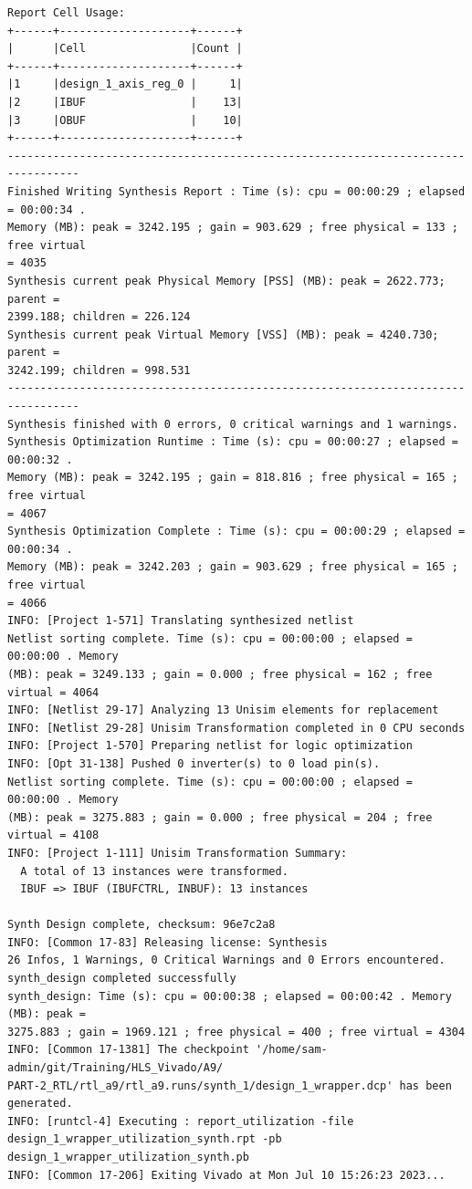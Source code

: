 \documentclass{article}
\begin{document}
\begin{lstlisting}
Report Cell Usage: 
+------+--------------------+------+
|      |Cell                |Count |
+------+--------------------+------+
|1     |design_1_axis_reg_0 |     1|
|2     |IBUF                |    13|
|3     |OBUF                |    10|
+------+--------------------+------+
---------------------------------------------------------------------------------
Finished Writing Synthesis Report : Time (s): cpu = 00:00:29 ; elapsed = 00:00:34 . 
Memory (MB): peak = 3242.195 ; gain = 903.629 ; free physical = 133 ; free virtual 
= 4035
Synthesis current peak Physical Memory [PSS] (MB): peak = 2622.773; parent = 
2399.188; children = 226.124
Synthesis current peak Virtual Memory [VSS] (MB): peak = 4240.730; parent = 
3242.199; children = 998.531
---------------------------------------------------------------------------------
Synthesis finished with 0 errors, 0 critical warnings and 1 warnings.
Synthesis Optimization Runtime : Time (s): cpu = 00:00:27 ; elapsed = 00:00:32 . 
Memory (MB): peak = 3242.195 ; gain = 818.816 ; free physical = 165 ; free virtual 
= 4067
Synthesis Optimization Complete : Time (s): cpu = 00:00:29 ; elapsed = 00:00:34 . 
Memory (MB): peak = 3242.203 ; gain = 903.629 ; free physical = 165 ; free virtual 
= 4066
INFO: [Project 1-571] Translating synthesized netlist
Netlist sorting complete. Time (s): cpu = 00:00:00 ; elapsed = 00:00:00 . Memory 
(MB): peak = 3249.133 ; gain = 0.000 ; free physical = 162 ; free virtual = 4064
INFO: [Netlist 29-17] Analyzing 13 Unisim elements for replacement
INFO: [Netlist 29-28] Unisim Transformation completed in 0 CPU seconds
INFO: [Project 1-570] Preparing netlist for logic optimization
INFO: [Opt 31-138] Pushed 0 inverter(s) to 0 load pin(s).
Netlist sorting complete. Time (s): cpu = 00:00:00 ; elapsed = 00:00:00 . Memory 
(MB): peak = 3275.883 ; gain = 0.000 ; free physical = 204 ; free virtual = 4108
INFO: [Project 1-111] Unisim Transformation Summary:
  A total of 13 instances were transformed.
  IBUF => IBUF (IBUFCTRL, INBUF): 13 instances

Synth Design complete, checksum: 96e7c2a8
INFO: [Common 17-83] Releasing license: Synthesis
26 Infos, 1 Warnings, 0 Critical Warnings and 0 Errors encountered.
synth_design completed successfully
synth_design: Time (s): cpu = 00:00:38 ; elapsed = 00:00:42 . Memory (MB): peak = 
3275.883 ; gain = 1969.121 ; free physical = 400 ; free virtual = 4304
INFO: [Common 17-1381] The checkpoint '/home/sam-admin/git/Training/HLS_Vivado/A9/
PART-2_RTL/rtl_a9/rtl_a9.runs/synth_1/design_1_wrapper.dcp' has been generated.
INFO: [runtcl-4] Executing : report_utilization -file 
design_1_wrapper_utilization_synth.rpt -pb design_1_wrapper_utilization_synth.pb
INFO: [Common 17-206] Exiting Vivado at Mon Jul 10 15:26:23 2023...


\end{lstlisting}
\end{document}
